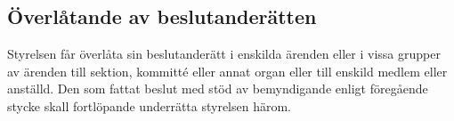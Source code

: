         \subsection{Överlåtande av beslutanderätten}
        \label{subsec:overlatandeavbeslutanderatten}
                Styrelsen får överlåta sin beslutanderätt i enskilda ärenden eller i vissa grupper av ärenden till sektion, kommitté eller annat organ eller till enskild medlem eller anställd. Den som fattat beslut med stöd av bemyndigande enligt föregående stycke skall fortlöpande underrätta styrelsen härom.
